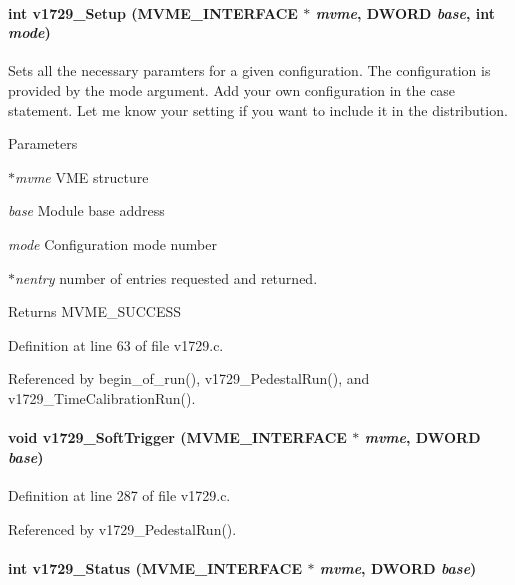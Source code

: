 \paragraph[{v1729\_\-Setup}]{\setlength{\rightskip}{0pt plus 5cm}int v1729\_\-Setup ({\bf MVME\_\-INTERFACE} $\ast$ {\em mvme}, \/  {\bf DWORD} {\em base}, \/  int {\em mode})}\hfill\label{v1729_8h_a16a8a323c157ed043a86ac69a6ada37d}
Sets all the necessary paramters for a given configuration. The configuration is provided by the mode argument. Add your own configuration in the case statement. Let me know your setting if you want to include it in the distribution. 
\begin{DoxyParams}{Parameters}
\item[{\em $\ast$mvme}]VME structure \item[{\em base}]Module base address \item[{\em mode}]Configuration mode number \item[{\em $\ast$nentry}]number of entries requested and returned. \end{DoxyParams}
\begin{DoxyReturn}{Returns}
MVME\_\-SUCCESS 
\end{DoxyReturn}


Definition at line 63 of file v1729.c.

Referenced by begin\_\-of\_\-run(), v1729\_\-PedestalRun(), and v1729\_\-TimeCalibrationRun().
\paragraph[{v1729\_\-SoftTrigger}]{\setlength{\rightskip}{0pt plus 5cm}void v1729\_\-SoftTrigger ({\bf MVME\_\-INTERFACE} $\ast$ {\em mvme}, \/  {\bf DWORD} {\em base})}\hfill\label{v1729_8h_aabf534ea5032d992b1c5a823939f37b0}


Definition at line 287 of file v1729.c.

Referenced by v1729\_\-PedestalRun().
\paragraph[{v1729\_\-Status}]{\setlength{\rightskip}{0pt plus 5cm}int v1729\_\-Status ({\bf MVME\_\-INTERFACE} $\ast$ {\em mvme}, \/  {\bf DWORD} {\em base})}\hfill\label{v1729_8h_a6025f9ff1237562264e91f22ca834fb7}


